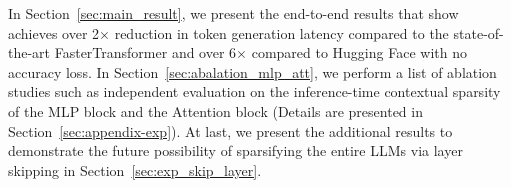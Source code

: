 



In Section~\ref{sec:main_result}, we present the end-to-end results that show \name{} achieves over 2$\times$ reduction in token generation latency compared to the state-of-the-art FasterTransformer and over 6$\times$ compared to Hugging Face with no accuracy loss. In Section~\ref{sec:abalation_mlp_att}, we perform a list of ablation studies such as independent evaluation on the inference-time contextual sparsity of the MLP block and the Attention block (Details are presented in Section~\ref{sec:appendix-exp}). At last, we present the additional results to demonstrate the future possibility of sparsifying the entire LLMs via layer skipping in Section~\ref{sec:exp_skip_layer}. 




